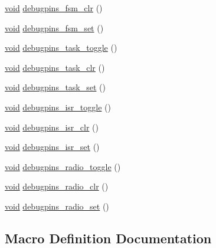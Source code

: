 \begin{DoxyCompactItemize}
\item 
\hyperlink{usb__devapi_8h_afabf60e7f57651d6d595a02c75f07cd0}{void} \hyperlink{group__debugpins_gaba8ca5762f3946abe08a2fd60f526018}{debugpins\+\_\+fsm\+\_\+clr} ()
\item 
\hyperlink{usb__devapi_8h_afabf60e7f57651d6d595a02c75f07cd0}{void} \hyperlink{group__debugpins_gabf50b5145dad1b666f26d5ddbc824e40}{debugpins\+\_\+fsm\+\_\+set} ()
\item 
\hyperlink{usb__devapi_8h_afabf60e7f57651d6d595a02c75f07cd0}{void} \hyperlink{group__debugpins_ga99a18520e34187483e8914b69ef05afd}{debugpins\+\_\+task\+\_\+toggle} ()
\item 
\hyperlink{usb__devapi_8h_afabf60e7f57651d6d595a02c75f07cd0}{void} \hyperlink{group__debugpins_gaf62f9250757ae1c09eb39042a16e0251}{debugpins\+\_\+task\+\_\+clr} ()
\item 
\hyperlink{usb__devapi_8h_afabf60e7f57651d6d595a02c75f07cd0}{void} \hyperlink{group__debugpins_gae0fe9c48d906fe3dd00192efa489b557}{debugpins\+\_\+task\+\_\+set} ()
\item 
\hyperlink{usb__devapi_8h_afabf60e7f57651d6d595a02c75f07cd0}{void} \hyperlink{group__debugpins_gad4ae7bd1ab90b3825cf5a8f635038752}{debugpins\+\_\+isr\+\_\+toggle} ()
\item 
\hyperlink{usb__devapi_8h_afabf60e7f57651d6d595a02c75f07cd0}{void} \hyperlink{group__debugpins_ga3ce81a5798029811061c1a4342774318}{debugpins\+\_\+isr\+\_\+clr} ()
\item 
\hyperlink{usb__devapi_8h_afabf60e7f57651d6d595a02c75f07cd0}{void} \hyperlink{group__debugpins_gac4710fcf9befb8c9b174954cf0bfb17d}{debugpins\+\_\+isr\+\_\+set} ()
\item 
\hyperlink{usb__devapi_8h_afabf60e7f57651d6d595a02c75f07cd0}{void} \hyperlink{group__debugpins_ga7811b5c703d511c4f825909e7c401ff2}{debugpins\+\_\+radio\+\_\+toggle} ()
\item 
\hyperlink{usb__devapi_8h_afabf60e7f57651d6d595a02c75f07cd0}{void} \hyperlink{group__debugpins_ga2862bd39a60ffc6ac5e6d49b4d8442d1}{debugpins\+\_\+radio\+\_\+clr} ()
\item 
\hyperlink{usb__devapi_8h_afabf60e7f57651d6d595a02c75f07cd0}{void} \hyperlink{group__debugpins_ga7ad27e0da9558cdb64bb3a383e889808}{debugpins\+\_\+radio\+\_\+set} ()
\end{DoxyCompactItemize}


\subsection{Macro Definition Documentation}
